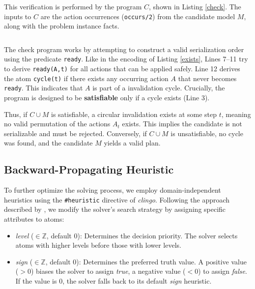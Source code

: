 \documentclass[
     11pt,                    %
     a4paper,             %
     BCOR=10mm,     %
     DIV=14,                 %
     listof=totoc,                    %
     bibliography=totoc,       %
     index=totoc,              %
     parskip            %
     twoside,
     headsepline
     ]{scrreprt}
\theoremstyle{definition}
\theoremstyle{definition}
\theoremstyle{remark}
\theoremstyle{bfnote}
\begin{document}
This verification is performed by the program $C$, shown in Listing \ref{check}. 
The inputs to $C$ are the action occurrences (\texttt{occurs/2}) from the candidate model $M$, along with the problem instance facts.

\begin{listing}[H]
  \caption{Encoding for Detecting Circular Invalidation (Check Program)}
  \inputminted[frame=single,framesep=2mm,baselinestretch=1.2,linenos]{prolog}{encodings/EX_check.lp}
  \label{check}
\end{listing}
The check program works by attempting to construct a valid serialization order using the predicate \texttt{ready}. Like in the encoding of Listing \ref{exists}, Lines 7--11 try to derive \texttt{ready(A,t)} for all actions that can be applied safely.
Line 12 derives the atom \texttt{cycle(t)} if there exists any occurring action $A$ that never becomes \texttt{ready}. This indicates that $A$ is part of a invalidation cycle.
Crucially, the program is designed to be \textbf{satisfiable} only if a cycle exists (Line 3).

Thus, if $C \cup M$ is satisfiable, a circular invalidation exists at some step $t$, meaning no valid permutation of the actions $A_t$ exists. This implies the candidate is not serializable and must be rejected.
Conversely, if $C \cup M$ is unsatisfiable, no cycle was found, and the candidate $M$ yields a valid plan.

\subsection{Backward-Propagating Heuristic}
To further optimize the solving process, we employ domain-independent heuristics using the \texttt{\#heuristic} directive of \textit{clingo}.
Following the approach described by \textcite{DIMOPOULOS_2019}, we modify the solver's search strategy by assigning specific attributes to atoms:
\begin{itemize}
  \item \textit{level} ($\in \mathbb{Z}$, default $0$): Determines the decision priority. The solver selects atoms with higher levels before those with lower levels.
  \item \textit{sign} ($\in \mathbb{Z}$, default $0$): Determines the preferred truth value. A positive value ($>0$) biases the solver to assign \textit{true}, a negative value ($<0$) to assign \textit{false}. If the value is $0$, the solver falls back to its default \textit{sign} heuristic.
\end{itemize}
\end{document}
